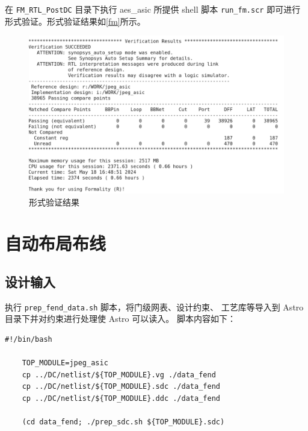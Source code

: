 \documentclass[12pt,hyperref,a4paper,UTF8]{ctexart}
\begin{document}
在 \texttt{FM\_RTL\_PostDC} 目录下执行 aes\_asic 所提供 shell 
脚本 \texttt{run\_fm.scr} 即可进行形式验证。形式验证结果如\autoref{fm}所示。

\begin{figure}[htbp]
    \centering
    \includegraphics[width =.8\textwidth]{figures/fm.png}
    \caption{形式验证结果}
    \label{fm}
\end{figure}
\newpage
\section{自动布局布线}
\subsection{设计输入}
执行 \texttt{prep\_fend\_data.sh} 脚本，将门级网表、设计约束、
工艺库等导入到 Astro 目录下并对约束进行处理使 Astro 可以读入。
脚本内容如下：
\begin{lstlisting}[style=bashstyle, name=prep_fend_data.sh]
    #!/bin/bash

    TOP_MODULE=jpeg_asic
    cp ../DC/netlist/${TOP_MODULE}.vg ./data_fend
    cp ../DC/netlist/${TOP_MODULE}.sdc ./data_fend
    cp ../DC/netlist/${TOP_MODULE}.ddc ./data_fend
    
    (cd data_fend; ./prep_sdc.sh ${TOP_MODULE}.sdc)
\end{lstlisting}
    
\end{document}
